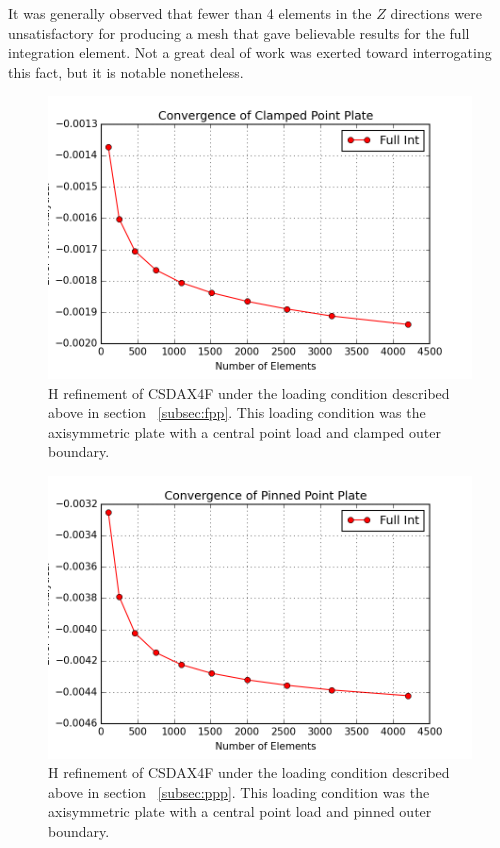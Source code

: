 \documentclass[10pt,letterpaper]{report}
\numberwithin{equation}{chapter}
\begin{document}
It was generally observed that fewer than 4 elements in the $Z$ directions were unsatisfactory for producing a mesh that gave believable results for the full integration element. Not a great deal of work was exerted toward interrogating this fact, but it is notable nonetheless.


\begin{figure}[H]
\centering
\includegraphics[width=0.7\linewidth]{./GoodImages/Conv_PlPoCl_2}
\caption[H refinement of CSDAX4F]{H refinement of CSDAX4F under the loading condition described above in section ~\ref{subsec:fpp}. This loading condition was the axisymmetric plate with a central point load and clamped outer boundary.}
\label{fig:Fig1}
\end{figure}

\begin{figure}[H]
\centering
\includegraphics[width=0.7\linewidth]{./GoodImages/Conv_PlPoPi_2}
\caption[H refinement of CSDAX4F]{H refinement of CSDAX4F under the loading condition described above in section ~\ref{subsec:ppp}. This loading condition was the axisymmetric plate with a central point load and pinned outer boundary.}
\label{fig:Fig2}
\end{figure}
\end{document}
